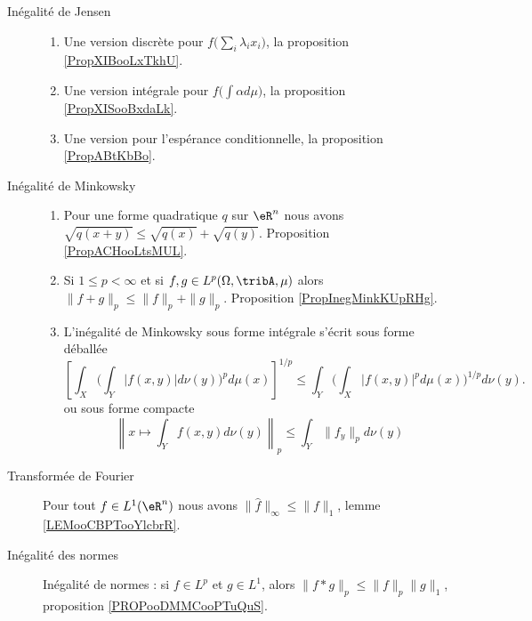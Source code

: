 \begin{description}
    \item[Inégalité de Jensen] 
        \begin{enumerate}
            \item
                Une version discrète pour \( f\big( \sum_i\lambda_ix_i \big)\), la proposition \ref{PropXIBooLxTkhU}.
            \item
                Une version intégrale pour \( f\big( \int \alpha d\mu \big)\), la proposition \ref{PropXISooBxdaLk}.
            \item
                Une version pour l'espérance conditionnelle, la proposition \ref{PropABtKbBo}.
        \end{enumerate}
    \item[Inégalité de Minkowsky]
        \begin{enumerate}
            \item
                Pour une forme quadratique \( q\) sur \( \eR^n\) nous avons $\sqrt{q(x+y)}\leq\sqrt{q(x)}+\sqrt{q(y)}$. Proposition \ref{PropACHooLtsMUL}.
            \item
                Si \( 1\leq p<\infty\) et si \( f,g\in L^p(\Omega,\tribA,\mu)\) alors \(  \| f+g \|_p\leq \| f \|_p+\| g \|_p\). Proposition \ref{PropInegMinkKUpRHg}.
            \item
                L'inégalité de Minkowsky sous forme intégrale s'écrit sous forme déballée
                \begin{equation}
                    \left[ \int_X\Big( \int_Y| f(x,y) |d\nu(y) \Big)^pd\mu(x) \right]^{1/p}\leq \int_Y\Big( \int_X| f(x,y) |^pd\mu(x) \Big)^{1/p}d\nu(y).
                \end{equation}
                ou sous forme compacte
                \begin{equation}
                    \left\|   x\mapsto\int_Y f(x,y)d\nu(y)   \right\|_p\leq \int_Y  \| f_y \|_pd\nu(y)
                \end{equation}
        \end{enumerate}
    \item[Transformée de Fourier]
                Pour tout \( f\in L^1(\eR^n)\) nous avons \( \| \hat f \|_{\infty}\leq \| f \|_1\), lemme \ref{LEMooCBPTooYlcbrR}.
    \item[Inégalité des normes]
        Inégalité de normes : si \( f\in L^p\) et \( g\in L^1\), alors \( \| f*g \|_p\leq \| f \|_p\| g \|_1\), proposition \ref{PROPooDMMCooPTuQuS}.

\end{description}

